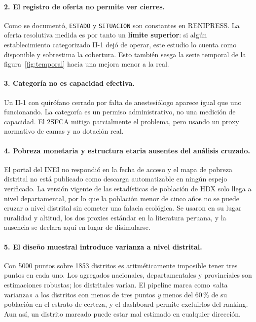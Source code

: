 \documentclass[10pt,a4paper]{article}
\begin{document}
\paragraph{2. El registro de oferta no permite ver cierres.}
Como se documentó, \texttt{ESTADO} y \texttt{SITUACION} son constantes en
RENIPRESS. La oferta resolutiva medida es por tanto un \textbf{límite superior}:
si algún establecimiento categorizado II-1 dejó de operar, este estudio lo cuenta
como disponible y sobrestima la cobertura. Esto también sesga la serie temporal
de la figura~\ref{fig:temporal} hacia una mejora menor a la real.

\paragraph{3. Categoría no es capacidad efectiva.}
Un II-1 con quirófano cerrado por falta de anestesiólogo aparece igual que uno
funcionando. La categoría es un permiso administrativo, no una medición de
capacidad. El 2SFCA mitiga parcialmente el problema, pero usando un proxy
normativo de camas y no dotación real.

\paragraph{4. Pobreza monetaria y estructura etaria ausentes del análisis cruzado.}
El portal del INEI no respondió en la fecha de acceso y el mapa de pobreza
distrital no está publicado como descarga automatizable en ningún espejo
verificado. La versión vigente de las estadísticas de población de HDX solo llega
a nivel departamental, por lo que la población menor de cinco años no se puede
cruzar a nivel distrital sin cometer una falacia ecológica. Se usaron en su lugar
ruralidad y altitud, los dos proxies estándar en la literatura peruana, y la
ausencia se declara aquí en lugar de disimularse.

\paragraph{5. El diseño muestral introduce varianza a nivel distrital.}
Con \num{5000} puntos sobre \num{1853} distritos es aritméticamente imposible
tener tres puntos en cada uno. Los agregados nacionales, departamentales y
provinciales son estimaciones robustas; los distritales varían. El pipeline marca
como «alta varianza» a los distritos con menos de tres puntos \emph{y} menos del
\num{60}\,\% de su población en el estrato de certeza, y el dashboard permite
excluirlos del ranking. Aun así, un distrito marcado puede estar mal estimado en
cualquier dirección.
\end{document}
